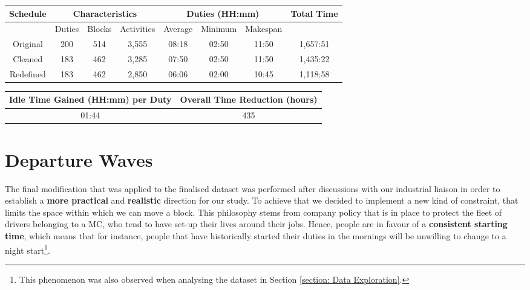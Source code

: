 
\begin{table}[ht]
\small
    \centering 
    \begin{tabular}{|c|c|c|c|c|c|c|c|}
        \hline
        \textbf{Schedule} & \multicolumn{3}{|c|}{ \textbf{Characteristics}} & \multicolumn{3}{|c|}{ \textbf{Duties (HH:mm)}} & \textbf{Total Time}  \\
        \hline
        & Duties & Blocks & Activities & Average &  Minimum & Makespan & \\
        \hline
        Original & 200 & 514 & 3,555 & 08:18 & 02:50 & 11:50 & 1,657:51 \\
        \hline
        Cleaned & 183 & 462 & 3,285 & 07:50 & 02:50 & 11:50 & 1,435:22 \\
        \hline
        Redefined & 183 & 462 & 2,850 & 06:06 & 02:00 & 10:45 & 1,118:58 \\
        \hline
    \end{tabular}%
    \medbreak
\end{table}



\begin{table}[h]
\small
    \centering 
\begin{tabular}{c|c}
        \textbf{Idle Time Gained (HH:mm) per Duty} & \textbf{Overall Time Reduction (hours)} \\
        \hline
         01:44 & 435 \\
\end{tabular}
\end{table}


\section{Departure Waves} %
\label{section: Wave Instances - Data}
The final modification that was applied to the finalised dataset was performed after discussions with our industrial liaison in order to establish a \textbf{more practical} and \textbf{realistic} direction for our study. To achieve that we decided to implement a new kind of constraint, that limits the space within which we can move a block. This philosophy stems from company policy that is in place to protect the fleet of drivers belonging to a MC, who tend to have set-up their lives around their jobs. Hence, people are in favour of a \textbf{consistent starting time}, which means that for instance, people that have historically started their duties in the mornings will be unwilling to change to a night start\footnote{This phenomenon was also observed when analysing the dataset in Section \ref{section: Data Exploration}.}.

